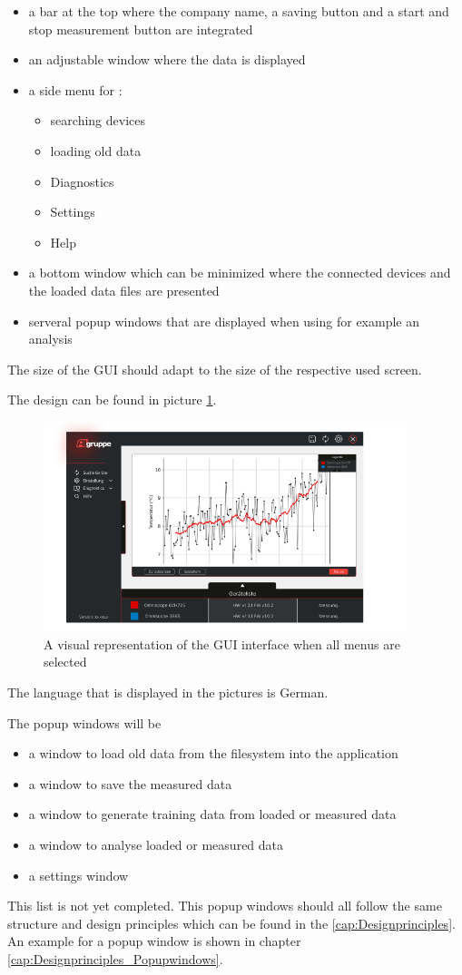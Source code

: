\documentclass{scrreprt}
\begin{document}
\begin{itemize}
    \item a bar at the top where the company name, a saving button and a start and stop measurement button are integrated 
    \item an adjustable window where the data is displayed
    \item a side menu for : 
    \begin{itemize}
        \item searching devices 
        \item loading old data 
        \item Diagnostics
        \item Settings
        \item Help
    \end{itemize}
    \item a bottom window which can be minimized where the connected devices and the loaded data files are presented 
    \item serveral popup windows that are displayed when using for example an analysis
\end{itemize}

The size of the GUI should adapt to the size of the respective used screen.

The design can be found in picture \ref{fig: GUI}. 
\begin{figure}[!h]
    \includegraphics[width= 400px]{assets/pictures/DatawindowVersion1.0.png}
    \caption[]{A visual representation of the GUI interface when all menus are selected}
    \label{fig: GUI}
\end{figure}
The language that is displayed in the pictures is German.  


The popup windows will be 
\begin{itemize}
    \item a window to load old data from the filesystem into the application
    \item a window to save the measured data 
    \item a window to generate training data from loaded or measured data
    \item a window to analyse loaded or measured data 
    \item a settings window 
\end{itemize}
This list is not yet completed. 
This popup windows should all follow the same structure and design principles which can be found in the \ref{cap:Designprinciples}. 
An example for a popup window is shown in chapter \ref{cap:Designprinciples_Popupwindows}.
\end{document}
